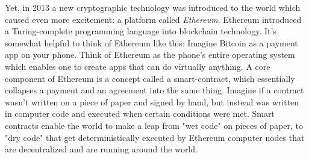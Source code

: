 \documentclass{article}
\begin{document}
Yet, in 2013 a new cryptographic technology was introduced to the world which caused even more excitement: a platform called \textit{Ethereum}. Ethereum introduced a Turing-complete programming language into blockchain technology. It's somewhat helpful to think of Ethereum like this: Imagine Bitcoin as a payment app on your phone. Think of Ethereum as the phone's entire operating system which enables one to create apps that can do virtually anything.
A core component of Ethereum is a concept called a \gls{smart-contract}, which essentially collapses a payment and an agreement into the same thing. Imagine if a contract wasn't written on a piece of paper and signed by hand, but instead was written in computer code and executed when certain conditions were met. Smart contracts enable the world to make a leap from "wet code" on pieces of paper, to "dry code" that get deterministically executed by Ethereum computer nodes that are decentralized and are running around the world.
\end{document}
